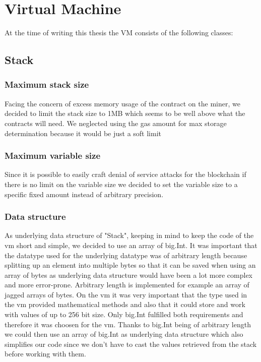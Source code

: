 \section{Virtual Machine}

At the time of writing this thesis the VM consists of the following classes:

\subsection{Stack}


\subsubsection{Maximum stack size}
Facing the concern of excess memory usage of the contract on the miner, we decided to limit the stack size to 1MB which seems to be well above what the contracts will need. We neglected using the gas amount for max storage determination because it would be just a soft limit

\subsubsection{Maximum variable size}
Since it is possible to easily craft denial of service attacks for the blockchain if there is no limit on the variable size we decided to set the variable size to a specific fixed amount instead of arbitrary precision.

\subsubsection{Data structure}
As underlying data structure of "Stack", keeping in mind to keep the code of the vm short and simple, we decided to use an array of big.Int. It was important that the datatype used for the underlying datatype was of arbitrary length because splitting up an element into multiple bytes so that it can be saved when using an array of bytes as underlying data structure would have been a lot more complex and more error-prone. Arbitrary length is implemented for example an array of jagged arrays of bytes. On the vm it was very important that the type used in the vm provided mathematical methods and also that it could store and work with values of up to 256 bit size. Only big.Int fulfilled both requirements and therefore it was choosen for the vm. Thanks to big.Int being of arbitrary length we could then use an array of big.Int as underlying data structure which also simplifies our code since we don't have to cast the values retrieved from the stack before working with them.

